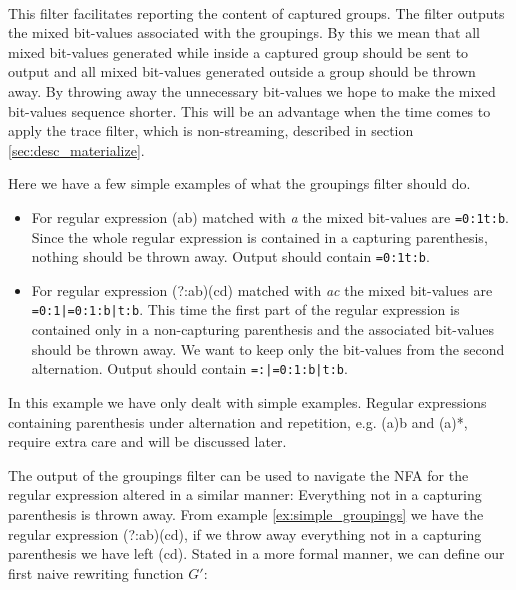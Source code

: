 \paragraph{}

This filter facilitates reporting the content of captured groups. The
filter outputs the mixed bit-values associated with the groupings. By
this we mean that all mixed bit-values generated while inside a
captured group should be sent to output and all mixed bit-values
generated outside a group should be thrown away. By throwing away the
unnecessary bit-values we hope to make the mixed bit-values sequence
shorter. This will be an advantage when the time comes to apply the
trace filter, which is non-streaming, described in section
\vref{sec:desc_materialize}.

\begin{example}
  \label{ex:simple_groupings}
  Here we have a few simple examples of what the groupings filter
  should do. 
  \begin{itemize}
  \item
    For regular expression \textsf{(a\textbar b)} matched with
    \textsl{a} the mixed bit-values are \texttt{=0:1\textbar t:b}. Since
    the whole regular expression is contained in a capturing
    parenthesis, nothing should be thrown away. Output should contain
    \texttt{=0:1\textbar t:b}.
  \item
    For regular expression \textsf{(?:a\textbar b)(c\textbar d)} matched
    with \textsl{ac} the mixed bit-values are
    \texttt{=0:1|=0:1:b|t:b}. This time the first part of the regular
    expression is contained only in a non-capturing parenthesis and the
    associated bit-values should be thrown away. We want to keep only the
    bit-values from the second alternation. Output should contain
    \texttt{=:|=0:1:b|t:b}.
  \end{itemize}
  
  In this example we have only dealt with simple examples. Regular
  expressions containing parenthesis under alternation and repetition,
  e.g. \textsf{(a)\textbar b} and \textsf{(a)*}, require extra care
  and will be discussed later.
\end{example}

The output of the groupings filter can be used to navigate the NFA for
the regular expression altered in a similar manner: Everything not in
a capturing parenthesis is thrown away. From example
\vref{ex:simple_groupings} we have the regular expression
\textsf{(?:a\textbar b)(c\textbar d)}, if we throw away everything not
in a capturing parenthesis we have left \textsf{(c\textbar d)}. Stated
in a more formal manner, we can define our first naive rewriting
function $G'$:

